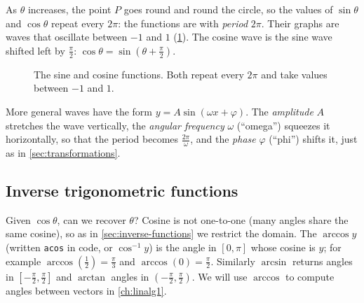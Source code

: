 As $\theta$ increases, the point $P$ goes round and round the circle, so the
values of $\sin\theta$ and $\cos\theta$ repeat every $2\pi$: the functions are
 with \emph{period} $2\pi$. Their graphs are
waves that oscillate between $-1$ and $1$ (\cref{fig:sin-cos}). The cosine
wave is the sine wave shifted left by $\frac{\pi}{2}$:
$\cos\theta = \sin\left(\theta + \frac{\pi}{2}\right)$.

\begin{figure}[htbp]
\centering
{}
\caption{The sine and cosine functions. Both repeat every $2\pi$ and take
  values between $-1$ and $1$.}
\label{fig:sin-cos}
\end{figure}

More general waves have the form $y = A\sin(\omega x + \varphi)$. The
\emph{amplitude} $A$ stretches the wave vertically, the \emph{angular frequency}
$\omega$ (``omega'') squeezes it horizontally, so that the period becomes
$\frac{2\pi}{\omega}$, and the \emph{phase} $\varphi$ (``phi'') shifts it, just
as in \cref{sec:transformations}.

\subsection{Inverse trigonometric functions}

Given $\cos\theta$, can we recover $\theta$? Cosine is not one-to-one (many
angles share the same cosine), so as in \cref{sec:inverse-functions} we
restrict the domain. The  $\arccos y$ (written
\texttt{acos} in code, or $\cos^{-1} y$) is the angle in $[0, \pi]$ whose
cosine is $y$; for example $\arccos\left(\tfrac12\right) = \tfrac{\pi}{3}$ and
$\arccos(0) = \tfrac{\pi}{2}$. Similarly $\arcsin$ returns angles in
$\left[-\frac{\pi}{2}, \frac{\pi}{2}\right]$ and $\arctan$ angles in
$\left(-\frac{\pi}{2}, \frac{\pi}{2}\right)$. We will use $\arccos$ to compute
angles between vectors in \cref{ch:linalg1}.

